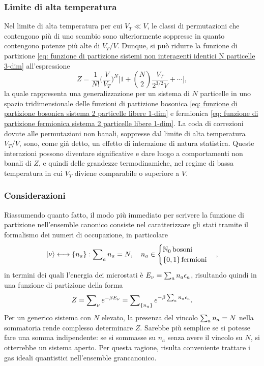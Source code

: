 \subsubsection{Limite di alta temperatura}
Nel limite di alta temperatura per cui $V_T \ll V$, le classi di permutazioni che contengono più di uno scambio sono ulteriormente soppresse in quanto contengono potenze più alte di $V_T/V$. Dunque, si può ridurre la funzione di partizione \eqref{eq: funzione di partizione sistemi non interagenti identici N particelle 3-dim} all'espressione
\begin{equation}
    Z = \frac{1}{N!}\bigg(\frac{V}{V_T}\bigg)^N\bigg[1 + \binom{N}{2}\frac{V_T}{2^{3/2}V} + \cdots \bigg],
\end{equation}
la quale rappresenta una generalizzazione per un sistema di $N$ particelle in uno spazio tridimensionale delle funzioni di partizione bosonica \eqref{eq: funzione di partizione bosonica sistema 2 particelle libere 1-dim} e fermionica \eqref{eq: funzione di partizione fermionica sistema 2 particelle libere 1-dim}. La coda di correzioni dovute alle permutazioni non banali, soppresse dal limite di alta temperatura $V_T/V$, sono, come già detto, un effetto di interazione di natura statistica. Queste interazioni possono diventare significative e dare luogo a comportamenti non banali di $Z$, e quindi delle grandezze termodinamiche, nel regime di bassa temperatura in cui $V_T$ diviene comparabile o superiore a $V$.

\subsubsection{Considerazioni}
Riassumendo quanto fatto, il modo più immediato per scrivere la funzione di partizione nell'ensemble canonico consiste nel caratterizzare gli stati tramite il formalismo dei numeri di occupazione, in particolare
\begin{equation}
    \ket{\nu} \longleftrightarrow \{n_a\} : \sum\nolimits_a n_a = N,\quad n_a \in 
    \begin{cases}
        \mathbb{N}_0\,\mathrm{bosoni} \\
        \{0,1\} \,\mathrm{fermioni}
    \end{cases},
\end{equation}
in termini dei quali l'energia dei microstati è $E_\nu = \sum\nolimits_a n_a\epsilon_a$, risultando quindi in una funzione di partizione della forma
\begin{equation}
    Z= \sum\nolimits_\nu e^{-\beta E_\nu} = \sum\nolimits_{\{n_a\}}e^{-\beta\sum\nolimits_an_a\epsilon_a}.
\end{equation}
Per un generico sistema con $N$ elevato, la presenza del vincolo $\sum\nolimits_a n_a = N$ nella sommatoria rende complesso determinare $Z$. Sarebbe più semplice se si potesse fare una somma indipendente: se si sommasse su $n_a$ senza avere il vincolo su $N$, si otterrebbe un sistema aperto. Per questa ragione, risulta conveniente trattare i gas ideali quantistici nell'ensemble grancanonico.